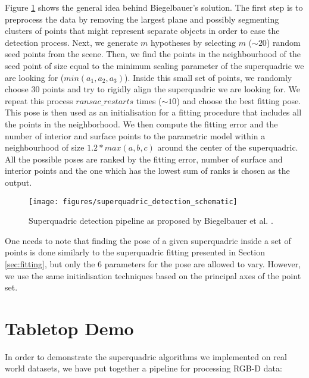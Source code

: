\documentclass{article}
\begin{document}
Figure \ref{fig:superquadric_detection_schematic} shows the general idea behind Biegelbauer's solution. The first step is to preprocess the data by removing the largest plane and possibly segmenting clusters of points that might represent separate objects in order to ease the detection process. Next, we generate $m$ hypotheses by selecting $m$ ($\sim 20$) random seed points from the scene. Then, we find the points in the neighbourhood of the seed point of size equal to the minimum scaling parameter of the superquadric we are looking for ($min (a_1, a_2, a_3)$). Inside this small set of points, we randomly choose 30 points and try to rigidly align the superquadric we are looking for. We repeat this process $ransac\_restarts$ times ($\sim 10$) and choose the best fitting pose. This pose is then used as an initialisation for a fitting procedure that includes all the points in the neighborhood. We then compute the fitting error and the number of interior and surface points to the parametric model within a neighbourhood of size $1.2 * max(a,b,c)$ around the center of the superquadric. All the possible poses are ranked by the fitting error, number of surface and interior points and the one which has the lowest sum of ranks is chosen as the output.

\begin{figure}
\centering
\texttt{[image: figures/superquadric\_detection\_schematic]}

\caption{Superquadric detection pipeline as proposed by Biegelbauer et al. \cite{conf/icra/BiegelbauerV07}.}
\label{fig:superquadric_detection_schematic}
\end{figure}

One needs to note that finding the pose of a given superquadric inside a set of points is done similarly to the superquadric fitting presented in Section \ref{sec:fitting}, but only the 6 parameters for the pose are allowed to vary. However, we use the same initialisation techniques based on the principal axes of the point set.

\section {Tabletop Demo}
\label{sec:tabletop_demo} 

In order to demonstrate the superquadric algorithms we implemented on real world datasets, we have put together a pipeline for processing RGB-D data:
\end{document}
